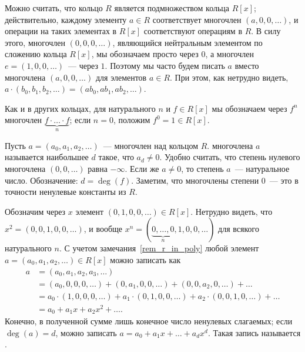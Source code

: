 \begin{remark}\label{rem_r_in_poly}
Можно считать, что кольцо $R$ является подмножеством кольца $R[x]$;
действительно, каждому элементу $a\in R$ соответствует многочлен
$(a,0,0,\dots)$, и операции на таких элементах в $R[x]$ соответствуют
операциям в $R$. В силу этого, многочлен $(0,0,0,\dots)$, являющийся
нейтральным элементом по сложению кольца $R[x]$, мы обозначаем просто
через $0$, а многочлен $e=(1,0,0,\dots)$~--- через $1$. Поэтому мы
часто будем писать $a$ вместо многочлена $(a,0,0,\dots)$ для элементов
$a\in R$. При этом, как нетрудно видеть,
$a\cdot (b_0,b_1,b_2,\dots)=(ab_0,ab_1,ab_2,\dots)$.
\end{remark}

\begin{remark}
Как и в других кольцах, для натурального $n$ и $f\in R[x]$ мы
обозначаем через $f^n$ многочлен
$\underbrace{f\cdot\dots\cdot f}_{n}$; если $n=0$, положим $f^0=1\in
R[x]$.
\end{remark}

\begin{definition}
Пусть $a=(a_0,a_1,a_2,\dots)$~--- многочлен над кольцом $R$.
 многочлена $a$ называется
наибольшее $d$ такое, что
$a_d\neq 0$. Удобно считать, что степень нулевого многочлена
$(0,0,\dots)$ равна $-\infty$. Если же $a\neq 0$, то степень $a$~---
натуральное число. Обозначение: $d=\deg(f)$. Заметим, что многочлены
степени $0$~--- это в точности ненулевые константы из $R$.
\end{definition}

\begin{remark}
Обозначим через $x$ элемент $(0,1,0,0,\dots)\in R[x]$. Нетрудно
видеть, что $x^2=(0,0,1,0,0,\dots)$, и вообще
$x^n=(\underbrace{0,\dots,0}_{n},1,0,0,\dots)$ для всякого
натурального $n$.
С учетом замечания~\ref{rem_r_in_poly} любой элемент
$a=(a_0,a_1,a_2,\dots)\in R[x]$ можно записать как
\begin{align*}
a&=(a_0,a_1,a_2,a_3,\dots)\\
&=(a_0,0,0,0,\dots)+(0,a_1,0,0,\dots)+(0,0,a_2,0,\dots)+\dots\\
&=a_0\cdot(1,0,0,0,\dots)+a_1\cdot(0,1,0,0,\dots)+a_2\cdot(0,0,1,0,\dots)+\dots\\
&=a_0+a_1x+a_2x^2+\dots.
\end{align*}
Конечно, в полученной сумме лишь конечное число ненулевых слагаемых;
если $\deg(a)=d$, можно записать $a=a_0+a_1x+\dots+a_dx^d$. Такая
запись называется .
\end{remark}

